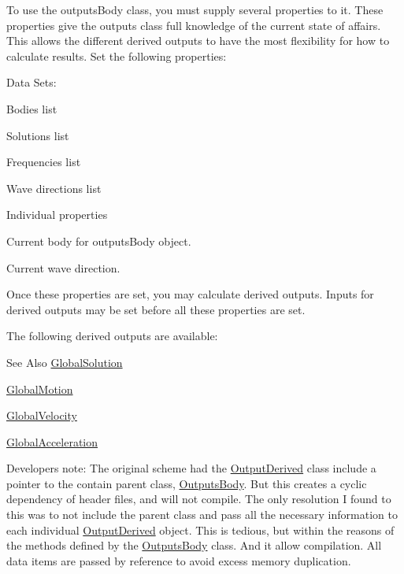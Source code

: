 To use the outputs\-Body class, you must supply several properties to it. These properties give the outputs class full knowledge of the current state of affairs. This allows the different derived outputs to have the most flexibility for how to calculate results. Set the following properties\-:

Data Sets\-:
\begin{DoxyEnumerate}
\item Bodies list
\item Solutions list
\item Frequencies list
\item Wave directions list
\end{DoxyEnumerate}

Individual properties
\begin{DoxyEnumerate}
\item Current body for outputs\-Body object.
\item Current wave direction.
\end{DoxyEnumerate}

Once these properties are set, you may calculate derived outputs. Inputs for derived outputs may be set before all these properties are set.

The following derived outputs are available\-: \begin{DoxySeeAlso}{See Also}
\hyperlink{classosea_1_1ofreq_1_1_global_solution}{Global\-Solution} 

\hyperlink{classosea_1_1ofreq_1_1_global_motion}{Global\-Motion} 

\hyperlink{classosea_1_1ofreq_1_1_global_velocity}{Global\-Velocity} 

\hyperlink{classosea_1_1ofreq_1_1_global_acceleration}{Global\-Acceleration}
\end{DoxySeeAlso}

\begin{DoxyItemize}
\item Developers note\-: The original scheme had the \hyperlink{classosea_1_1ofreq_1_1_output_derived}{Output\-Derived} class include a pointer to the contain parent class, \hyperlink{classosea_1_1ofreq_1_1_outputs_body}{Outputs\-Body}. But this creates a cyclic dependency of header files, and will not compile. The only resolution I found to this was to not include the parent class and pass all the necessary information to each individual \hyperlink{classosea_1_1ofreq_1_1_output_derived}{Output\-Derived} object. This is tedious, but within the reasons of the methods defined by the \hyperlink{classosea_1_1ofreq_1_1_outputs_body}{Outputs\-Body} class. And it allow compilation. All data items are passed by reference to avoid excess memory duplication. 
\end{DoxyItemize}

